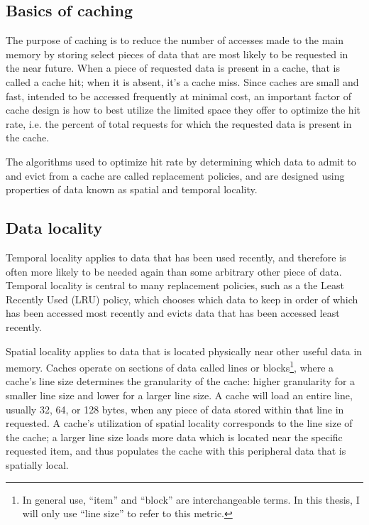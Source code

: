 \documentclass[12pt,twoside]{reedthesis}
\begin{document}
	\subsection*{Basics of caching}
	
	The purpose of caching is to reduce the number of accesses made to the main memory by storing select pieces of data that are most likely to be requested in the near future. When a piece of requested data is present in a cache, that is called a cache hit; when it is absent, it's a cache miss. Since caches are small and fast, intended to be accessed frequently at minimal cost, an important factor of cache design is how to best utilize the limited space they offer to optimize the hit rate, i.e. the percent of total requests for which the requested data is present in the cache.
	
	The algorithms used to optimize hit rate by determining which data to admit to and evict from a cache are called replacement policies, and are designed using properties of data known as spatial and temporal locality.

	\subsection*{Data locality}
	
	Temporal locality applies to data that has been used recently, and therefore is often more likely to be needed again than some arbitrary other piece of data. Temporal locality is central to many replacement policies, such as a the Least Recently Used (LRU) policy, which chooses which data to keep in order of which has been accessed most recently and evicts data that has been accessed least recently.
	
	Spatial locality applies to data that is located physically near other useful data in memory. Caches operate on sections of data called lines or blocks\footnote{In general use, ``item'' and ``block'' are interchangeable terms. In this thesis, I will only use ``line size'' to refer to this metric.}, where a cache's line size determines the granularity of the cache: higher granularity for a smaller line size and lower for a larger line size. A cache will load an entire line, usually 32, 64, or 128 bytes, when any piece of data stored within that line in requested. A cache's utilization of spatial locality corresponds to the line size of the cache; a larger line size loads more data which is located near the specific requested item, and thus populates the cache with this peripheral data that is spatially local.
\end{document}
